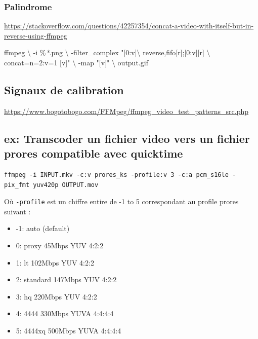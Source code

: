 \documentclass[
  french,
]{book}
\newenvironment{Shaded}{\begin{snugshade}}{\end{snugshade}}
\newcommand{\DataTypeTok}[1]{\textcolor[rgb]{0.13,0.29,0.53}{#1}}
\newcommand{\ExtensionTok}[1]{#1}
\newcommand{\NormalTok}[1]{#1}
\newcommand{\PreprocessorTok}[1]{\textcolor[rgb]{0.56,0.35,0.01}{\textit{#1}}}
\newcommand{\StringTok}[1]{\textcolor[rgb]{0.31,0.60,0.02}{#1}}
\providecommand{\tightlist}{%
  \setlength{\itemsep}{0pt}\setlength{\parskip}{0pt}}
\begin{document}
\hypertarget{palindrome}{%
\subsubsection{Palindrome}\label{palindrome}}

\url{https://stackoverflow.com/questions/42257354/concat-a-video-with-itself-but-in-reverse-using-ffmpeg}

\begin{Shaded}
\begin{Highlighting}[]
\ExtensionTok{ffmpeg} \DataTypeTok{\textbackslash{}}
\NormalTok{{-}i \%}\PreprocessorTok{*}\NormalTok{.png }\DataTypeTok{\textbackslash{}}
\NormalTok{{-}filter\_complex }\StringTok{"[0:v]}\DataTypeTok{\textbackslash{}}
\StringTok{reverse,fifo[r];[0:v][r] }\DataTypeTok{\textbackslash{}}
\StringTok{concat=n=2:v=1 [v]"} \DataTypeTok{\textbackslash{}}
\NormalTok{{-}map }\StringTok{"[v]"} \DataTypeTok{\textbackslash{}}
\NormalTok{output.gif}
\end{Highlighting}
\end{Shaded}

\hypertarget{signaux-de-calibration}{%
\subsection{Signaux de calibration}\label{signaux-de-calibration}}

\url{https://www.bogotobogo.com/FFMpeg/ffmpeg_video_test_patterns_src.php}

\hypertarget{ex-transcoder-un-fichier-video-vers-un-fichier-prores-compatible-avec-quicktime}{%
\subsection{ex: Transcoder un fichier video vers un fichier prores compatible avec quicktime}\label{ex-transcoder-un-fichier-video-vers-un-fichier-prores-compatible-avec-quicktime}}

\begin{verbatim}
ffmpeg -i INPUT.mkv -c:v prores_ks -profile:v 3 -c:a pcm_s16le -pix_fmt yuv420p OUTPUT.mov
\end{verbatim}

Où \texttt{-profile} est un chiffre entire de -1 to 5 correspondant au profile prores suivant :

\begin{itemize}
\tightlist
\item
  -1: auto (default)
\item
  0: proxy 45Mbps YUV 4:2:2
\item
  1: lt 102Mbps YUV 4:2:2
\item
  2: standard 147Mbps YUV 4:2:2
\item
  3: hq 220Mbps YUV 4:2:2
\item
  4: 4444 330Mbps YUVA 4:4:4:4
\item
  5: 4444xq 500Mbps YUVA 4:4:4:4
\end{itemize}
\end{document}
